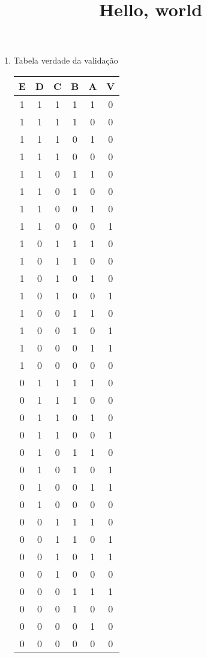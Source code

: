 \documentclass[12pt]{article}
\title{Hello, world}
\begin{document}

\begin{enumerate}
	\item Tabela verdade da validação
	
	\begin{tabular}{|c|c|c|c|c|c|}
	\hline
	
	E & D & C & B & A & V \\ \hline
	1 & 1 & 1 & 1 & 1 & 0 \\ \hline
	1 & 1 & 1 & 1 & 0 & 0 \\ \hline
	1 & 1 & 1 & 0 & 1 & 0 \\ \hline
	1 & 1 & 1 & 0 & 0 & 0 \\ \hline
	1 & 1 & 0 & 1 & 1 & 0 \\ \hline
	1 & 1 & 0 & 1 & 0 & 0 \\ \hline
	1 & 1 & 0 & 0 & 1 & 0 \\ \hline
	1 & 1 & 0 & 0 & 0 & 1 \\ \hline %
	1 & 0 & 1 & 1 & 1 & 0 \\ \hline
	1 & 0 & 1 & 1 & 0 & 0 \\ \hline
	1 & 0 & 1 & 0 & 1 & 0 \\ \hline
	1 & 0 & 1 & 0 & 0 & 1 \\ \hline %
	1 & 0 & 0 & 1 & 1 & 0 \\ \hline
	1 & 0 & 0 & 1 & 0 & 1 \\ \hline %
	1 & 0 & 0 & 0 & 1 & 1 \\ \hline %
	1 & 0 & 0 & 0 & 0 & 0 \\ \hline
	0 & 1 & 1 & 1 & 1 & 0 \\ \hline
	0 & 1 & 1 & 1 & 0 & 0 \\ \hline
	0 & 1 & 1 & 0 & 1 & 0 \\ \hline
	0 & 1 & 1 & 0 & 0 & 1 \\ \hline %
	0 & 1 & 0 & 1 & 1 & 0 \\ \hline
	0 & 1 & 0 & 1 & 0 & 1 \\ \hline %
	0 & 1 & 0 & 0 & 1 & 1 \\ \hline %
	0 & 1 & 0 & 0 & 0 & 0 \\ \hline
	0 & 0 & 1 & 1 & 1 & 0 \\ \hline
	0 & 0 & 1 & 1 & 0 & 1 \\ \hline %
	0 & 0 & 1 & 0 & 1 & 1 \\ \hline %
	0 & 0 & 1 & 0 & 0 & 0 \\ \hline
	0 & 0 & 0 & 1 & 1 & 1 \\ \hline %
	0 & 0 & 0 & 1 & 0 & 0 \\ \hline
	0 & 0 & 0 & 0 & 1 & 0 \\ \hline
	0 & 0 & 0 & 0 & 0 & 0 \\ \hline
	\end{tabular}
\end{enumerate}
\end{document}
